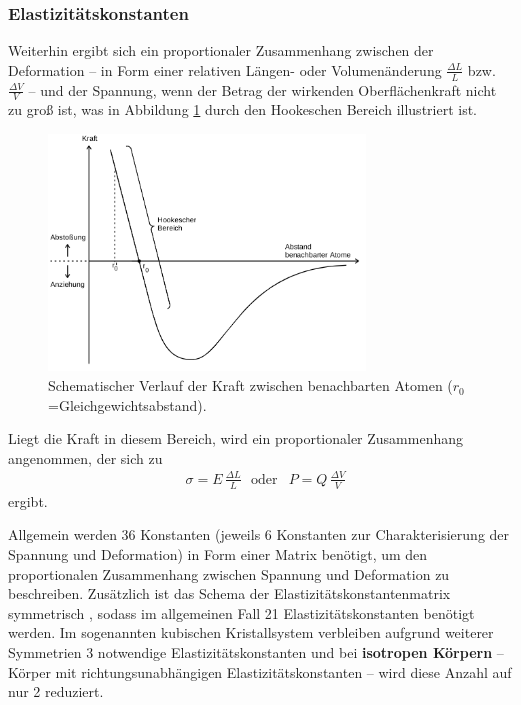 \subsubsection{Elastizitätskonstanten}
Weiterhin ergibt sich ein proportionaler Zusammenhang zwischen der Deformation -- in Form
einer relativen Längen- oder Volumenänderung $\frac{\Delta L}{L}$ bzw.
$\frac{\Delta V}{V}$ -- und der Spannung, wenn der Betrag der wirkenden Oberflächenkraft nicht
zu groß ist, was in Abbildung \ref{fig:Hooki} durch den Hookeschen Bereich illustriert ist.
\begin{figure}
	\centering
	\includegraphics[width=0.75\textwidth]{Bilder/HookscherBereich.png}
	\caption{Schematischer Verlauf der Kraft zwischen benachbarten Atomen ($r_{\mathrm{0}}$=Gleichgewichtsabstand).  \cite{Anleitung}}
	\label{fig:Hooki}
\end{figure}
Liegt die Kraft in diesem Bereich, wird ein proportionaler Zusammenhang angenommen, der sich zu
\begin{align}
	\label{eqn:elastimodi}
	  & \sigma = E \, \frac{\Delta L}{L} \,\,\,\, \mathrm{oder} & P = Q \, \frac{\Delta V}{V}
\end{align}
ergibt.

Allgemein werden 36 Konstanten (jeweils 6 Konstanten zur Charakterisierung der Spannung und
Deformation) in Form einer Matrix benötigt, um den proportionalen Zusammenhang zwischen
Spannung und Deformation zu beschreiben.
Zusätzlich ist das Schema der Elastizitätskonstantenmatrix symmetrisch \cite{tomatensauce},
sodass im allgemeinen Fall 21 Elastizitätskonstanten benötigt werden.
Im sogenannten kubischen Kristallsystem verbleiben aufgrund weiterer Symmetrien 3 notwendige
Elastizitätskonstanten und bei \textbf{isotropen Körpern} -- Körper mit richtungsunabhängigen
Elastizitätskonstanten -- wird diese Anzahl auf nur 2 reduziert.

